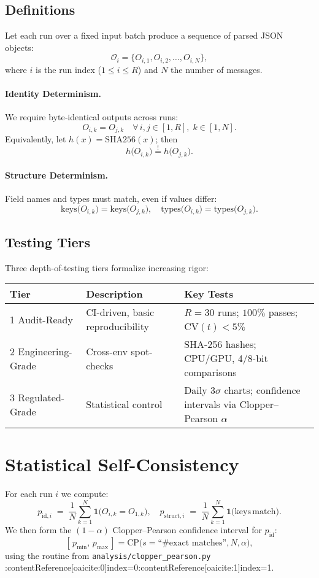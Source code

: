 \documentclass{report}
\begin{document}
	\subsection{Definitions}
	Let each run over a fixed input batch produce a sequence of parsed JSON objects:
	\[
	\mathcal{O}_i = \bigl\{O_{i,1}, O_{i,2}, \dots, O_{i,N}\bigr\},
	\]
	where $i$ is the run index ($1 \le i \le R$) and $N$ the number of messages.
	
	\paragraph{Identity Determinism.}  
	We require byte‐identical outputs across runs:
	\[
	O_{i,k} = O_{j,k}
	\quad\forall\,i,j\in[1,R],\;k\in[1,N].
	\]
	Equivalently, let $h(x)=\mathrm{SHA256}(x)$; then
	\[
	h\bigl(O_{i,k}\bigr) \overset{!}{=} h\bigl(O_{j,k}\bigr).
	\]
	
	\paragraph{Structure Determinism.}  
	Field names and types must match, even if values differ:
	\[
	\mathrm{keys}\bigl(O_{i,k}\bigr) 
	= \mathrm{keys}\bigl(O_{j,k}\bigr)
	,\quad
	\mathrm{types}\bigl(O_{i,k}\bigr) 
	= \mathrm{types}\bigl(O_{j,k}\bigr).
	\]
	
	\subsection{Testing Tiers}
	Three depth-of-testing tiers formalize increasing rigor:
	\begin{center}
		\begin{tabular}{@{}p{3cm}p{6cm}p{3cm}@{}}
			\toprule
			Tier & Description & Key Tests \\
			\midrule
			1 Audit-Ready & CI-driven, basic reproducibility & $R=30$ runs; $100\%$ passes; CV$(t)<5\%$ \\
			2 Engineering-Grade & Cross-env spot-checks & SHA-256 hashes; CPU/GPU, 4/8-bit comparisons \\
			3 Regulated-Grade & Statistical control & Daily 3$\sigma$ charts; confidence intervals via Clopper–Pearson $\alpha$ \\
			\bottomrule
		\end{tabular}
	\end{center}
	
	\section{Statistical Self-Consistency}
	For each run $i$ we compute:
	\[
	p_{\mathrm{id},i} \;=\;\frac{1}{N}\sum_{k=1}^N \mathbf{1}\bigl(O_{i,k}=O_{1,k}\bigr),
	\quad
	p_{\mathrm{struct},i} \;=\;\frac{1}{N}\sum_{k=1}^N \mathbf{1}\bigl(\mathrm{keys}\,\mathrm{match}\bigr).
	\]
	We then form the $(1-\alpha)$ Clopper–Pearson confidence interval for $p_{\mathrm{id}}$:
	\[
	[\,p_{\min},\,p_{\max}\,]
	= \mathrm{CP}\bigl(s=\text{``\# exact matches''}, N, \alpha\bigr),
	\]
	using the routine from \texttt{analysis/clopper\_pearson.py} :contentReference[oaicite:0]{index=0}:contentReference[oaicite:1]{index=1}.
	
\end{document}
